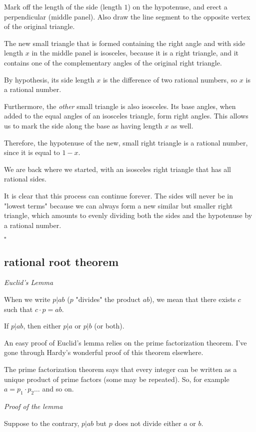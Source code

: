 \documentclass[11pt, oneside]{article}
\begin{document}
Mark off the length of the side (length $1$) on the hypotenuse, and erect a perpendicular (middle panel).  Also draw the line segment to the opposite vertex of the original triangle.

The new small triangle that is formed containing the right angle and with side length $x$ in the middle panel is isosceles, because it is a right triangle, and it  contains one of the complementary angles of the original right triangle.

By hypothesis, its side length $x$ is the difference of two rational numbers, so $x$ is a rational number.

Furthermore, the \emph{other} small triangle is also isosceles.  Its base angles, when added to the equal angles of an isosceles triangle, form right angles.  This allows us to mark the side along the base as having length $x$ as well.

Therefore, the hypotenuse of the new, small right triangle is a rational number, since it is equal to $1 - x$.

We are back where we started, with an isosceles right triangle that has all rational sides.  

It is clear that this process can continue forever.  The sides will never be in "lowest terms" because we can always form a new similar but smaller right triangle, which amounts to evenly dividing both the sides and the hypotenuse by a rational number.

$\square$

\subsection*{rational root theorem}

\emph{Euclid's Lemma}

When we write $p|ab$ ($p$ "divides" the product $ab$), we mean that there exists $c$ such that $c \cdot p = ab$. 

If $p|ab$, then either $p|a$ or $p|b$ (or both).

An easy proof of Euclid's lemma relies on the prime factorization theorem.  I've gone through Hardy's wonderful proof of this theorem elsewhere.

The prime factorization theorem says that every integer can be written as a unique product of prime factors (some may be repeated).  So, for example $a = p_1 \cdot p_2 \dots$ and so on.  

\emph{Proof of the lemma}

Suppose to the contrary, $p|ab$ but $p$ does not divide either $a$ or $b$.
\end{document}
